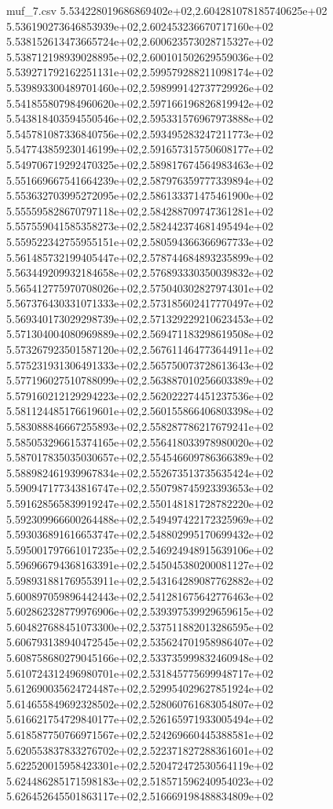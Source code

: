 \begin{filecontents*}{muf_7.csv}
5.534228019686869402e+02,2.604281078185740625e+02
5.536190273646853939e+02,2.602453236670717160e+02
5.538152613473665724e+02,2.600623573028715327e+02
5.538712198939028895e+02,2.600101502629559036e+02
5.539271792162251131e+02,2.599579288211098174e+02
5.539893300489701460e+02,2.598999142737729926e+02
5.541855807984960620e+02,2.597166196826819942e+02
5.543818403594550546e+02,2.595331576967973888e+02
5.545781087336840756e+02,2.593495283247211773e+02
5.547743859230146199e+02,2.591657315750608177e+02
5.549706719292470325e+02,2.589817674564983463e+02
5.551669667541664239e+02,2.587976359777339894e+02
5.553632703995272095e+02,2.586133371475461900e+02
5.555595828670797118e+02,2.584288709747361281e+02
5.557559041585358273e+02,2.582442374681495494e+02
5.559522342755955151e+02,2.580594366366967733e+02
5.561485732199405447e+02,2.578744684893235899e+02
5.563449209932184658e+02,2.576893330350039832e+02
5.565412775970708026e+02,2.575040302827974301e+02
5.567376430331071333e+02,2.573185602417770497e+02
5.569340173029298739e+02,2.571329229210623453e+02
5.571304004080969889e+02,2.569471183298619508e+02
5.573267923501587120e+02,2.567611464773644911e+02
5.575231931306491333e+02,2.565750073728613643e+02
5.577196027510788099e+02,2.563887010256603389e+02
5.579160212129294223e+02,2.562022274451237536e+02
5.581124485176619601e+02,2.560155866406803398e+02
5.583088846667255893e+02,2.558287786217679241e+02
5.585053296615374165e+02,2.556418033978980020e+02
5.587017835035030657e+02,2.554546609786366389e+02
5.588982461939967834e+02,2.552673513735635424e+02
5.590947177343816747e+02,2.550798745923393653e+02
5.591628565839919247e+02,2.550148181728782220e+02
5.592309966600264488e+02,2.549497422172325969e+02
5.593036891616653747e+02,2.548802995170699432e+02
5.595001797661017235e+02,2.546924948915639106e+02
5.596966794368163391e+02,2.545045380200081127e+02
5.598931881769553911e+02,2.543164289087762882e+02
5.600897059896442443e+02,2.541281675642776463e+02
5.602862328779976906e+02,2.539397539929659615e+02
5.604827688451073300e+02,2.537511882013286595e+02
5.606793138940472545e+02,2.535624701958986407e+02
5.608758680279045166e+02,2.533735999832460948e+02
5.610724312496980701e+02,2.531845775699948717e+02
5.612690035624724487e+02,2.529954029627851924e+02
5.614655849692328502e+02,2.528060761683054807e+02
5.616621754729840177e+02,2.526165971933005494e+02
5.618587750766971567e+02,2.524269660445388581e+02
5.620553837833276702e+02,2.522371827288361601e+02
5.622520015958423301e+02,2.520472472530564119e+02
5.624486285171598183e+02,2.518571596240954023e+02
5.626452645501863117e+02,2.516669198488834809e+02

\end{filecontents*}

